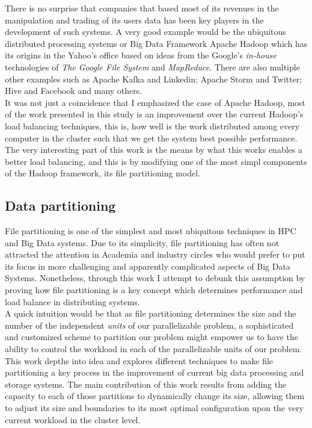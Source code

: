 There is no surprise that companies that based most of its revenues in the
manipulation and trading of its users data has been key players in the
development of such systems. A very good example would be the ubiquitous
distributed processing systems or Big Data Framework Apache Hadoop which has its
origins in the Yahoo's office based on ideas from the Google's \textit{in-house}
technologies of \textit{The Google File System} and \textit{MapReduce}\cite{ghemawat2003google}.
There are also multiple other examples such as Apache Kafka and Linkedin; Apache
Storm and Twitter; Hive and Facebook and many others. \\

It was not just a coincidence that I emphasized the case of Apache Hadoop, most
of the work presented in this study is an improvement over the current Hadoop's
load balancing techniques, this is, how well is the work distributed among every
computer in the cluster such that we get the system best possible performance.
The very interesting part of this work is the means by what this works enables a
better load balancing, and this is by modifying one of the most simpl
components of the Hadoop framework, its file partitioning model.

\subsection{Data partitioning}

File partitioning is one of the simplest and most ubiquitous techniques in HPC
and Big Data systems. Due to its simplicity, file partitioning has often
not attracted the attention in  Academia and industry circles who would prefer
to put its focus in more challenging and apparently complicated aspects of Big
Data Systems. Nonetheless, through this work I attempt to debunk this assumption
by proving how file partitioning is a key concept which determines performance and
load balance in distributing systems. \\

A quick intuition would be that as file
partitioning determines the size and the number of the independent 
\textit{units} of our parallelizable problem, a sophisticated and customized scheme 
to partition our problem might empower us to have the ability to control the
workload in each of the parallelizable units of our problem. \\

This work depths into idea and explores different techniques to make
file partitioning a key process in the improvement of current big data
processing and storage systems. The main contribution of this work results from
adding the capacity to each of those partitions to dynamically change its size,
allowing them to adjust its size and boundaries to its most optimal
configuration upon the very current workload in the cluster level.  \\

